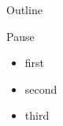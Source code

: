 \documentclass{beamer}
\begin{document}
\begin{frame}{Outline}
\end{frame}

\begin{frame}{Pause}
    \begin{itemize}
        \item first
        \item second
        \item \pause third
    \end{itemize}
\end{frame}
\end{document}

